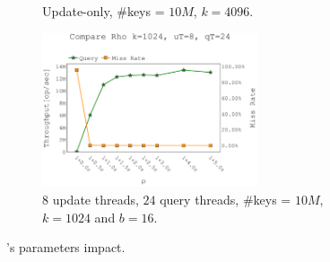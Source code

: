 \begin{figure}[htp!]
\begin{subfigure}{\textwidth}
    \caption{Update-only, \#keys = $10M$, $k=4096$.}
    \label{fig: throughput_update_compare_b}
    \end{subfigure}
\vfill
    \begin{subfigure}{\textwidth}
    \centering
    \includegraphics[width=0.7\textwidth,trim={0 0cm 0cm 0.7cm},clip]
    {graphics/graphs/parameters/oracle_Quancurrent_compare_rho_blocking_numa_k1024_b16_runs15_pre10M_pT1_keys10M_uT8_qT24_noUpdate_16-08-2022_09-20-38.pdf}
    \caption{$8$ update threads, $24$ query threads, \#keys = $10M$, $k=1024$ and $b=16$.}
    \label{fig: update_query_compare_rho}
    \end{subfigure}
\caption{\mysketch's parameters impact.}
\label{fig: parameters_exploration}
\end{figure}

